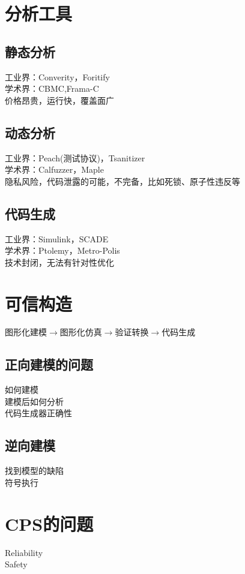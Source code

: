 \documentclass{article}
\begin{document}
\begin{CJK}{UTF8}{gbsn}
	\section{分析工具}
	\subsection{静态分析}
		工业界：Converity，Foritify\\
		学术界：CBMC,Frama-C\\
		价格昂贵，运行快，覆盖面广\\	
	\subsection{动态分析}
		工业界：Peach(测试协议)，Tsanitizer\\
		学术界：Calfuzzer，Maple\\
		隐私风险，代码泄露的可能，不完备，比如死锁、原子性违反等\\
	\subsection{代码生成}
		工业界：Simulink，SCADE\\
		学术界：Ptolemy，Metro-Polis\\
		技术封闭，无法有针对性优化\\
	
	\section{可信构造}
	图形化建模$\rightarrow$图形化仿真$\rightarrow$验证转换$\rightarrow$代码生成\\
	\subsection{正向建模的问题}
	如何建模\\
	建模后如何分析\\
	代码生成器正确性\\
	\subsection{逆向建模}
	
	找到模型的缺陷\\
	
    符号执行\\
    
	\section{CPS的问题}
	Reliability\\
	Safety\\
	

\end{CJK}
\end{document}
